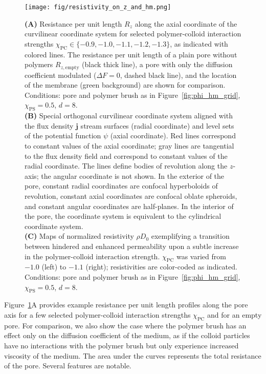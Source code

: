 \documentclass[12pt, a4paper]{article}
\begin{document}
\begin{figure}
    \centering
    \texttt{[image: fig/resistivity\_on\_z\_and\_hm.png]}
    \caption{
    \textbf{(A)} Resistance per unit length $R_{z}$ along the axial coordinate of the curvilinear coordinate system for selected polymer-colloid interaction strengths $\chi_{\textrm{PC}} \in \{ -0.9, -1.0, -1.1, -1.2, -1.3\}$, as indicated with colored lines.
    The resistance per unit length of a plain pore without polymers $R_{z, \textrm{empty}}$ (black thick line), a pore with only the diffusion coefficient modulated ($\Delta F = 0$, dashed black line), and the location of the membrane (green background) are shown for comparison. 
    Conditions: pore and polymer brush as in Figure~\ref{fig:phi_hm_grid}, $\chi_{\textrm{PS}}=0.5$, $d=8$.
    \\
    \textbf{(B)} Special orthogonal curvilinear coordinate system aligned with the flux density $\bm{j}$ stream surfaces (radial coordinate) and level sets of the potential function $\psi$ (axial coordinate).
    Red lines correspond to constant values of the axial coordinate; gray lines are tangential to the flux density field and correspond to constant values of the radial coordinate.
    The lines define bodies of revolution along the $z$-axis; the angular coordinate is not shown.
    In the exterior of the pore, constant radial coordinates are confocal hyperboloids of revolution, constant axial coordinates are confocal oblate spheroids, and constant angular coordinates are half-planes.
    In the interior of the pore, the coordinate system is equivalent to the cylindrical coordinate system.
    \\
    \textbf{(C)} Maps of normalized resistivity $\rho D_0$ exemplifying a transition between hindered and enhanced permeability upon a subtle increase in the polymer-colloid interaction strength.
    $\chi_{\textrm{PC}}$ was varied from $-1.0$ (left) to $-1.1$ (right); resistivities are color-coded as indicated. 
    Conditions: pore and polymer brush as in Figure~\ref{fig:phi_hm_grid}, $\chi_{\textrm{PS}}=0.5$, $d=8$.
    }
    \label{fig:R_map}
\end{figure}

Figure~\ref{fig:R_map}A provides example resistance per unit length profiles along the pore axis for a few selected polymer-colloid interaction strengths $\chi_{\textrm{PC}}$ and for an empty pore. 
For comparison, we also show the case where the polymer brush has an effect only on the diffusion coefficient of the medium, as if the colloid particles have no interactions with the polymer brush but only experience increased viscosity of the medium.
The area under the curves represents the total resistance of the pore.
Several features are notable. 
\end{document}
